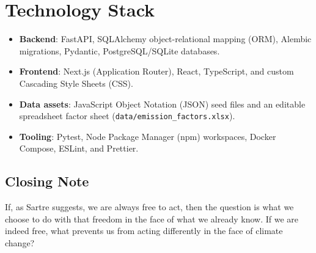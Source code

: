 \documentclass[11pt,a4paper]{article}
\begin{document}
\section*{Technology Stack}
\begin{itemize}
  \item \textbf{Backend}: FastAPI, SQLAlchemy object-relational mapping (ORM), Alembic migrations, Pydantic, PostgreSQL/SQLite databases.
  \item \textbf{Frontend}: Next.js (Application Router), React, TypeScript, and custom Cascading Style Sheets (CSS).
  \item \textbf{Data assets}: JavaScript Object Notation (JSON) seed files and an editable spreadsheet factor sheet (\texttt{data/emission\_factors.xlsx}).
  \item \textbf{Tooling}: Pytest, Node Package Manager (npm) workspaces, Docker Compose, ESLint, and Prettier.
\end{itemize}

\subsection*{Closing Note}
If, as Sartre suggests, we are always free to act, then the question is what we choose to do with that freedom in the face of what we already know. If we are indeed free, what prevents us from acting differently in the face of climate change?
\end{document}
